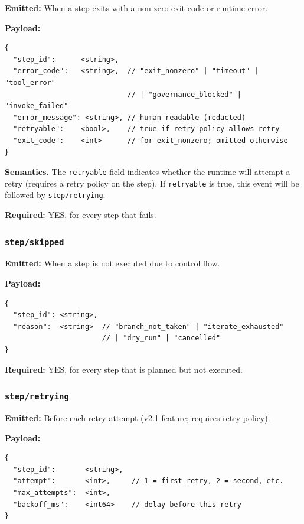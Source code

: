 \textbf{Emitted:} When a step exits with a non-zero exit code or runtime error.

\textbf{Payload:}
\begin{verbatim}
{
  "step_id":      <string>,
  "error_code":   <string>,  // "exit_nonzero" | "timeout" | "tool_error"
                             // | "governance_blocked" | "invoke_failed"
  "error_message": <string>, // human-readable (redacted)
  "retryable":    <bool>,    // true if retry policy allows retry
  "exit_code":    <int>      // for exit_nonzero; omitted otherwise
}
\end{verbatim}

\textbf{Semantics.} The \texttt{retryable} field indicates whether the runtime will attempt a retry (requires a retry policy on the step). If \texttt{retryable} is true, this event will be followed by \texttt{step/retrying}.

\textbf{Required:} YES, for every step that fails.


\subsubsection{\texttt{step/skipped}}

\textbf{Emitted:} When a step is not executed due to control flow.

\textbf{Payload:}
\begin{verbatim}
{
  "step_id": <string>,
  "reason":  <string>  // "branch_not_taken" | "iterate_exhausted"
                       // | "dry_run" | "cancelled"
}
\end{verbatim}

\textbf{Required:} YES, for every step that is planned but not executed.


\subsubsection{\texttt{step/retrying}}

\textbf{Emitted:} Before each retry attempt (v2.1 feature; requires retry policy).

\textbf{Payload:}
\begin{verbatim}
{
  "step_id":       <string>,
  "attempt":       <int>,     // 1 = first retry, 2 = second, etc.
  "max_attempts":  <int>,
  "backoff_ms":    <int64>    // delay before this retry
}
\end{verbatim}

